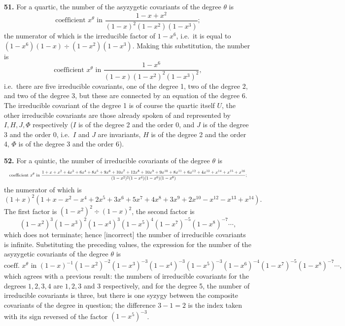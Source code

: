 \documentclass[11pt]{article}
\begin{document}
\textbf{51.} For a quartic, the number of the asyzygetic covariants of the degree $\theta$ is
\[
\text{coefficient } x^\theta \text{ in } \frac{1 - x + x^2}{(1 - x)^2(1 - x^2)(1 - x^3)};
\]
the numerator of which is the irreducible factor of $1 - x^6$, i.e.\ it is equal to $(1 - x^6)(1 - x) \div (1 - x^2)(1 - x^3)$. Making this substitution, the number is
\[
\text{coefficient } x^\theta \text{ in } \frac{1 - x^6}{(1 - x)(1 - x^2)^2(1 - x^3)^2},
\]
i.e.\ there are five irreducible covariants, one of the degree 1, two of the degree 2, and two of the degree 3, but these are connected by an equation of the degree 6. The irreducible covariant of the degree 1 is of course the quartic itself $U$, the other irreducible covariants are those already spoken of and represented by $I, H, J, \Phi$ respectively ($I$ is of the degree 2 and the order 0, and $J$ is of the degree 3 and the order 0, i.e.\ $I$ and $J$ are invariants, $H$ is of the degree 2 and the order 4, $\Phi$ is of the degree 3 and the order 6).

\textbf{52.} For a quintic, the number of irreducible covariants of the degree $\theta$ is
\[ \resizebox{\textwidth}{!}{$\displaystyle
\text{coefficient } x^\theta \text{ in } \frac{1 + x + x^2 + 4 x^3 + 6 x^4 + 8 x^5 + 9 x^6 + 10 x^7 + 12 x^8 + 10 x^9 + 9 x^{10} + 8 x^{11} + 6 x^{12} + 4 x^{13} + x^{14} + x^{15} + x^{16}}{(1 - x^2)^2(1 - x^4)(1 - x^6)(1 - x^8)};
$} \]
the numerator of which is
\[
(1 + x)^2(1 + x - x^2 - x^4 + 2 x^5 + 3 x^6 + 5 x^7 + 4 x^8 + 3 x^9 + 2 x^{10} - x^{12} - x^{13} + x^{14}).
\]
The first factor is $(1 - x^2)^2 \div (1 - x)^2$, the second factor is
\[
(1 - x^2)^3(1 - x^3)^2(1 - x^4)^3(1 - x^5)^4(1 - x^7)^{-5}(1 - x^8)^{-7}\cdots,
\]
which does not terminate; hence [incorrect] the number of irreducible covariants is infinite. Substituting the preceding values, the expression for the number of the asyzygetic covariants of the degree $\theta$ is
\[
\text{coeff. } x^\theta \text{ in } (1 - x)^{-1}(1 - x^2)^{-2}(1 - x^3)^{-3}(1 - x^4)^{-3}(1 - x^5)^{-3}(1 - x^6)^{-4}(1 - x^7)^{-5}(1 - x^8)^{-7}\cdots,
\]
which agrees with a previous result: the numbers of irreducible covariants for the degrees $1, 2, 3, 4$ are $1, 2, 3$ and $3$ respectively, and for the degree 5, the number of irreducible covariants is three, but there is one syzygy between the composite covariants of the degree in question; the difference $3 - 1 = 2$ is the index taken with its sign reversed of the factor $(1 - x^5)^{-3}$.
\end{document}
